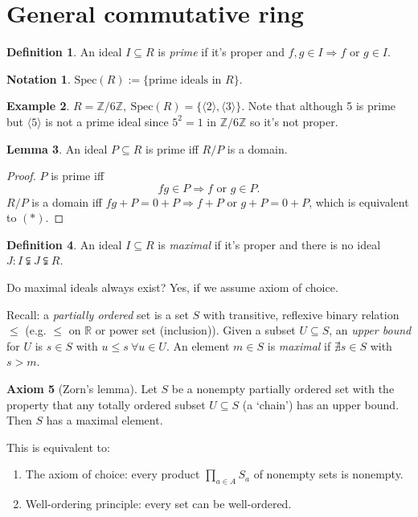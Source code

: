 \documentclass[a4paper]{article}
\newcommand{\la}{\langle}
\newcommand{\ra}{\rangle}
\newcommand{\Z}{\mathbb Z}
\newcommand{\Spec}{\text{Spec}}
\theoremstyle{definition}
\newtheorem{defn}{Definition}[subsection]
\newtheorem{lemma}[defn]{Lemma}
\newtheorem{example}[defn]{Example}
\newtheorem{axiom}[defn]{Axiom}
\newtheorem*{notation}{Notation}
\begin{document}
\section{General commutative ring}
\begin{defn}
An ideal $I\subseteq R$ is \textit{prime} if it's proper and $f,g\in I\Rightarrow f$ or $g\in I$.
\end{defn}
\begin{notation}
$\Spec(R):=\{\text{prime ideals in }R\}$.
\end{notation}
\begin{example}
$R=\Z/6\Z,\ \Spec(R)=\{\la 2\ra,\la 3\ra\}$.  Note that although 5 is prime but $\la 5\ra$ is not a prime ideal since $5^2=1$ in $\Z/6\Z$ so it's not proper.
\end{example}
\begin{lemma}
An ideal $P\subseteq R$ is prime iff $R/P$ is a domain.
\end{lemma}
\begin{proof}
$P$ is prime iff
\[
fg\in P\Rightarrow f \text{ or } g\in P. \tag{$\ast$}
\]
$R/P$ is a domain iff $fg+P=0+P \Rightarrow f+P$ or $g+P=0+P$, which is equivalent to $(\ast)$.
\end{proof}

\begin{defn}
An ideal $I\subseteq R$ is \textit{maximal} if it's proper and there is no ideal $J:I\subsetneqq J\subsetneqq R$.
\end{defn}

Do maximal ideals always exist? Yes, if we assume axiom of choice.

Recall: a \textit{partially ordered} set is a set $S$ with transitive, reflexive binary relation $\leq$ (e.g. $\leq$ on $\mathbb R$ or power set (inclusion)). Given a subset $U\subseteq S$, an \textit{upper bound} for $U$ is $s\in S$ with $u\leq s \ \forall u\in U$. An element $m\in S$ is \textit{maximal} if $\nexists s\in S$ with $s>m$.

\begin{axiom}[Zorn's lemma]
Let $S$ be a nonempty partially ordered set with the property that any totally ordered subset $U\subseteq S$ (a `chain') has an upper bound. Then $S$ has a maximal element.
\end{axiom}

This is equivalent to:
\begin{enumerate}
\item The axiom of choice: every product $\prod_{a\in A} S_a$ of nonempty sets is nonempty.
\item Well-ordering principle: every set can be well-ordered.
\end{enumerate}
\end{document}
